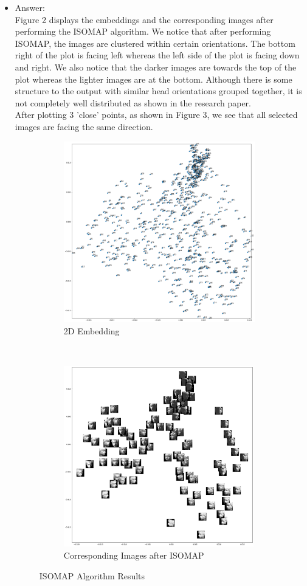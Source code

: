 \documentclass[twoside,10pt]{article}
\begin{document}
\begin{enumerate}
\begin{itemize}
\item Answer:\\
Figure 2 displays the embeddings and the corresponding images after performing the ISOMAP algorithm. We notice that after performing ISOMAP, the images are clustered within certain orientations. The bottom right of the plot is facing left whereas the left side of the plot is facing down and right. We also notice that the darker images are towards the top of the plot whereas the lighter images are at the bottom.
Although there is some structure to the output with similar head orientations grouped together, it is not completely well distributed as shown in the research paper.\\
After plotting 3 'close' points, as shown in Figure 3, we see that all selected images are facing the same direction.
\begin{figure}[t!]
    \centering
    \begin{subfigure}[t]{0.5\textwidth}
        \centering
        \includegraphics[height=3.1in]{Images/Q1bembeddings.png}
        \caption{2D Embedding}
    \end{subfigure}%
    ~ 
    \begin{subfigure}[t]{0.5\textwidth}
        \centering
        \includegraphics[height=3.1in]{Images/Q1bimages.png}
        \caption{Corresponding Images after ISOMAP}
    \end{subfigure}
    \caption{ISOMAP Algorithm Results}
\end{figure}


\end{itemize}
\end{enumerate}
\end{document}
